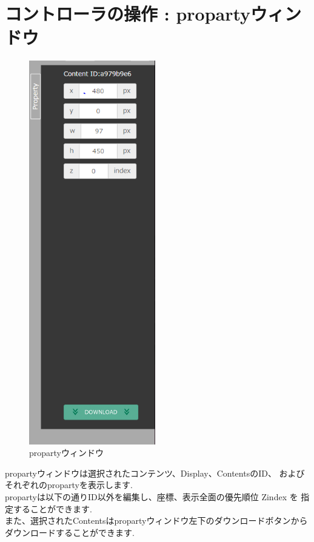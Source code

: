 \documentclass[a4paper,10pt,oneside]{jsbook}
\begin{document}
\chapter{コントローラの操作 : propartyウィンドウ }
\begin{figure}
	\begin{center}
		\includegraphics[width=5.5cm]{image/Prop_Down.PNG}
	\end{center}
	\caption{propartyウィンドウ}
	\label{fig:propall}
\end{figure}

propartyウィンドウは選択されたコンテンツ、Display、ContentsのID、
およびそれぞれのpropartyを表示します.\\

propartyは以下の通りID以外を編集し、座標、表示全面の優先順位 Zindex を
指定することができます.\\


また、選択されたContentsはpropartyウィンドウ左下のダウンロードボタンから
ダウンロードすることができます.\\
\end{document}
